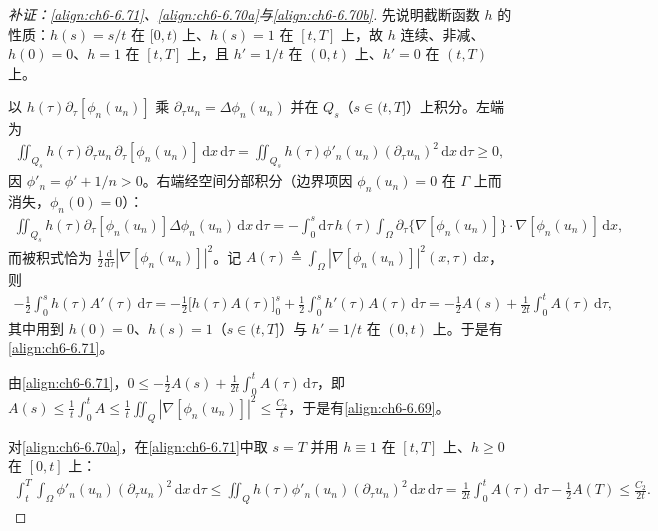\documentclass[../../main.tex]{subfiles}%
\begin{document}
\begin{proof}[补证：\eqref{align:ch6-6.71}、\eqref{align:ch6-6.70a}与\eqref{align:ch6-6.70b}]
先说明截断函数 $h$ 的性质：$h(s)=s/t$ 在 $[0,t)$ 上、$h(s)=1$ 在 $[t,T]$ 上，故 $h$ 连续、非减、$h(0)=0$、$h=1$ 在 $[t,T]$ 上，且 $h'=1/t$ 在 $(0,t)$ 上、$h'=0$ 在 $(t,T)$ 上。

以 $h(\tau)\partial_\tau[\phi_n(u_n)]$ 乘 $\partial_\tau u_n=\Delta\phi_n(u_n)$ 并在 $Q_s$（$s\in(t,T]$）上积分。左端为
\begin{align*}
\iint_{Q_s}h(\tau)\partial_\tau u_n\,\partial_\tau[\phi_n(u_n)]\,\mathrm{d}x\,\mathrm{d}\tau
=\iint_{Q_s}h(\tau)\phi'_n(u_n)(\partial_\tau u_n)^2\,\mathrm{d}x\,\mathrm{d}\tau\geqslant0,
\end{align*}
因 $\phi'_n=\phi'+1/n>0$。右端经空间分部积分（边界项因 $\phi_n(u_n)=0$ 在 $\Gamma$ 上而消失，$\phi_n(0)=0$）：
\begin{align*}
\iint_{Q_s}h(\tau)\partial_\tau[\phi_n(u_n)]\Delta\phi_n(u_n)\,\mathrm{d}x\,\mathrm{d}\tau
=-\int_0^s\mathrm{d}\tau\,h(\tau)\int_\Omega\partial_\tau\{\nabla[\phi_n(u_n)]\}\cdot\nabla[\phi_n(u_n)]\,\mathrm{d}x,
\end{align*}
而被积式恰为 $\frac{1}{2}\frac{\mathrm{d}}{\mathrm{d}\tau}|\nabla[\phi_n(u_n)]|^2$。记 $A(\tau)\triangleq\int_\Omega|\nabla[\phi_n(u_n)]|^2(x,\tau)\,\mathrm{d}x$，则
\begin{align*}
-\frac{1}{2}\int_0^sh(\tau)A'(\tau)\,\mathrm{d}\tau
=-\frac{1}{2}\Big[h(\tau)A(\tau)\Big]_0^s+\frac{1}{2}\int_0^sh'(\tau)A(\tau)\,\mathrm{d}\tau
=-\frac{1}{2}A(s)+\frac{1}{2t}\int_0^tA(\tau)\,\mathrm{d}\tau,
\end{align*}
其中用到 $h(0)=0$、$h(s)=1$（$s\in(t,T]$）与 $h'=1/t$ 在 $(0,t)$ 上。于是有\eqref{align:ch6-6.71}。

由\eqref{align:ch6-6.71}，$0\leqslant-\frac{1}{2}A(s)+\frac{1}{2t}\int_0^tA(\tau)\,\mathrm{d}\tau$，即 $A(s)\leqslant\frac{1}{t}\int_0^tA\leqslant\frac{1}{t}\iint_Q|\nabla[\phi_n(u_n)]|^2\leqslant\frac{C_2}{t}$，于是有\eqref{align:ch6-6.69}。

对\eqref{align:ch6-6.70a}，在\eqref{align:ch6-6.71}中取 $s=T$ 并用 $h\equiv1$ 在 $[t,T]$ 上、$h\geqslant0$ 在 $[0,t]$ 上：
\begin{align*}
\int_t^T\int_\Omega\phi'_n(u_n)(\partial_\tau u_n)^2\,\mathrm{d}x\,\mathrm{d}\tau
\leqslant\iint_Qh(\tau)\phi'_n(u_n)(\partial_\tau u_n)^2\,\mathrm{d}x\,\mathrm{d}\tau
=\frac{1}{2t}\int_0^tA(\tau)\,\mathrm{d}\tau-\frac{1}{2}A(T)\leqslant\frac{C_2}{2t}.
\end{align*}


\end{proof}
\end{document}
